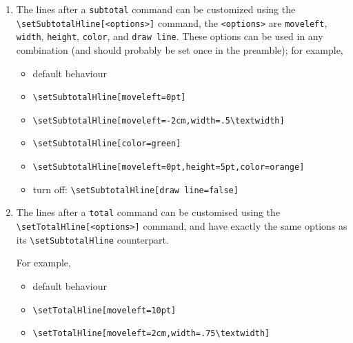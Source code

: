 \documentclass{outn}
\begin{document}
\bigskip
\total*

\begin{enumerate}
  \item The lines after a \verb!subtotal! command can be customized using
    the \verb!\setSubtotalHline[<options>]! command, the \verb!<options>! 
    are \verb!moveleft!, \verb!width!, \verb!height!, \verb!color!, 
    and \verb!draw line!. 
    These options can be used in any combination (and should probably be set once in the preamble); for example, 
    \begin{itemize}
      \item default behaviour

        \subtotal*
      \item \verb!\setSubtotalHline[moveleft=0pt]!
        \setSubtotalHline[moveleft=0pt]

        \subtotal*
      \item \verb!\setSubtotalHline[moveleft=-2cm,width=.5\textwidth]!
        \setSubtotalHline[moveleft=-2cm,width=.5\textwidth]

        \subtotal*
      \item \verb!\setSubtotalHline[color=green]!
        \setSubtotalHline[color=green] 

      \item \verb!\setSubtotalHline[moveleft=0pt,height=5pt,color=orange]!
        \setSubtotalHline[moveleft=0pt,height=5pt,color=orange]

        \subtotal*
      \item turn off: \verb!\setSubtotalHline[draw line=false]! 
            \setSubtotalHline[draw line=false]
        
        \subtotal*
    \end{itemize}
  \item The lines after a \verb!total! command can be customised 
    using the \verb!\setTotalHline[<options>]! command, and have
    exactly the same options as its \verb!\setSubtotalHline! counterpart.

    For example,
    \begin{itemize}
      \item default behaviour
        
      \item \verb!\setTotalHline[moveleft=10pt]!
        \setTotalHline[moveleft=10pt]

        \total*
      \item \verb!\setTotalHline[moveleft=2cm,width=.75\textwidth]!
        \setTotalHline[moveleft=2cm,width=.75\textwidth]


\end{itemize}
\end{enumerate}
\end{document}
